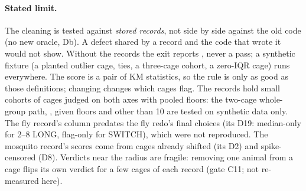 \paragraph{Stated limit.} The cleaning is tested against \emph{stored records}, not side by side against the old code
(no new oracle, Db). A defect shared by a record and the code that wrote it would not show. Without the records the
exit reports , never a pass; a synthetic fixture (a planted outlier cage, ties, a three-cage
cohort, a zero-IQR cage) runs everywhere. The score is a pair of KM statistics, so the rule is only as good as those
definitions; changing  changes which cages flag. The records hold small cohorts of cages judged on
both axes with pooled floors: the two-cage whole-group path, , given floors and 
other than 10 are tested on synthetic data only. The fly record's  column predates the fly redo's final
choices (its D19: median-only for 2--8 LONG, flag-only for SWITCH), which were not reproduced. The mosquito record's
scores come from cages already shifted (its D2) and spike-censored (D8). Verdicts near the radius are fragile: removing
one animal from a cage flips its own verdict for a few cages of each record (gate C11; not re-measured here).
